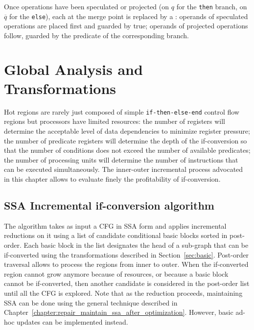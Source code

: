 Once operations have been speculated or projected (on $q$ for the \texttt{then} branch, on $\overline{q}$ for the \texttt{else}), each \phifuns at the merge point is replaced by a \psifun: operands of speculated operations are placed first and guarded by true; operands of projected operations follow, guarded by the predicate of the corresponding branch.

\section{Global Analysis and Transformations}
\label{sec:if_conversion:hyperblock}
Hot regions are rarely just composed of simple \texttt{if-then-else-end} control flow regions but processors have limited resources: the number of registers will determine the acceptable level of data dependencies to minimize register pressure; the number of predicate registers will determine the depth of the if-conversion so that the number of conditions does not exceed the number of available predicates; the number of processing units will determine the number of instructions that can be executed simultaneously. The inner-outer incremental process advocated in this chapter allows to evaluate finely the profitability of if-conversion. 

\subsection{SSA Incremental if-conversion algorithm}


The algorithm takes as input a CFG in SSA form and applies incremental reductions on it using a list of candidate conditional basic blocks sorted in post-order. 
Each basic block in the list designates the head of a sub-graph that can be if-converted using the transformations described in Section~\ref{sec:basic}. Post-order traversal allows to process the regions from inner to outer. When the if-converted region cannot grow anymore because of resources, or because a basic block cannot be if-converted, then another candidate is considered in the post-order list until all the CFG is explored.
%
%
Note that as the reduction proceeds, maintaining SSA can be done using the general technique described in Chapter~\ref{chapter:repair_maintain_ssa_after_optimization}. However, basic ad-hoc updates can be implemented instead. 

